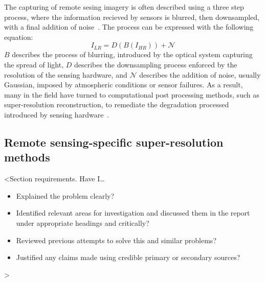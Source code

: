 The capturing of remote sesing imagery is often described using a three step process, where the information recieved by sensors is blurred, then downsampled, with a final addition of noise~\cite{superResRemoteSensingOverview, superResRemoteSensingChallenges, remoteSensingDeepLearningReview, remoteSensingGANsReview}. The process can be expressed with the following equation:
\[I_{LR} = D(B(I_{HR})) + \mathcal{N}\]
$B$ describes the process of blurring, introduced by the optical system capturing the spread of light, $D$ describes the downsampling process enforced by the resolution of the sensing hardware, and $\mathcal{N}$ describes the addition of noise, usually Gaussian, imposed by atmospheric conditions or sensor failures. As a result, many in the field have turned to computational post processing methods, such as super-resolution reconstruction, to remediate the degradation processed introduced by sensing hardware~\cite{superResRemoteSensingOverview}. 

\subsection{Remote sensing-specific super-resolution methods}
<Section requirements. Have I\dots
\begin{itemize}
    \item Explained the problem clearly?
    \item Identified relevant areas for investigation and discussed them in the report under appropriate headings and critically?
    \item Reviewed previous attempts to solve this and similar problems?
    \item Justified any claims made using credible primary or secondary sources?
\end{itemize}
>